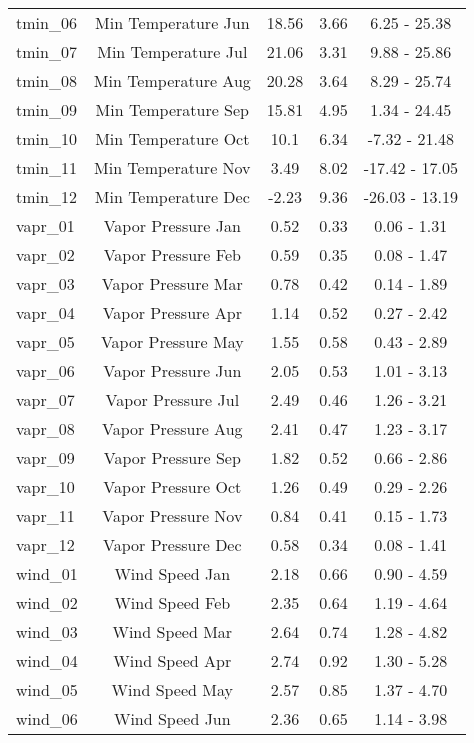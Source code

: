 \documentclass[AutoFakeBold]{LZUThesis-PgD&PhD}
\begin{document}
\begin{longtable}[H]{lcccc}
	   tmin\_06 & Min Temperature Jun & 18.56 & 3.66 & 6.25 - 25.38 \\
	   tmin\_07 & Min Temperature Jul & 21.06 & 3.31 & 9.88 - 25.86 \\
	   tmin\_08 & Min Temperature Aug & 20.28 & 3.64 & 8.29 - 25.74 \\
	   tmin\_09 & Min Temperature Sep & 15.81 & 4.95 & 1.34 - 24.45 \\
	   tmin\_10 & Min Temperature Oct & 10.1 & 6.34 & -7.32 - 21.48 \\
	   tmin\_11 & Min Temperature Nov & 3.49 & 8.02 & -17.42 - 17.05 \\
	   tmin\_12 & Min Temperature Dec & -2.23 & 9.36 & -26.03 - 13.19 \\
	   vapr\_01 & Vapor Pressure Jan & 0.52 & 0.33 & 0.06 - 1.31 \\
	   vapr\_02 & Vapor Pressure Feb & 0.59 & 0.35 & 0.08 - 1.47 \\
	   vapr\_03 & Vapor Pressure Mar & 0.78 & 0.42 & 0.14 - 1.89 \\
	   vapr\_04 & Vapor Pressure Apr & 1.14 & 0.52 & 0.27 - 2.42 \\
	   vapr\_05 & Vapor Pressure May & 1.55 & 0.58 & 0.43 - 2.89 \\
	   vapr\_06 & Vapor Pressure Jun & 2.05 & 0.53 & 1.01 - 3.13 \\
	   vapr\_07 & Vapor Pressure Jul & 2.49 & 0.46 & 1.26 - 3.21 \\
	   vapr\_08 & Vapor Pressure Aug & 2.41 & 0.47 & 1.23 - 3.17 \\
	   vapr\_09 & Vapor Pressure Sep & 1.82 & 0.52 & 0.66 - 2.86 \\
	   vapr\_10 & Vapor Pressure Oct & 1.26 & 0.49 & 0.29 - 2.26 \\
	   vapr\_11 & Vapor Pressure Nov & 0.84 & 0.41 & 0.15 - 1.73 \\
	   vapr\_12 & Vapor Pressure Dec & 0.58 & 0.34 & 0.08 - 1.41 \\
	   wind\_01 & Wind Speed Jan & 2.18 & 0.66 & 0.90 - 4.59 \\
	   wind\_02 & Wind Speed Feb & 2.35 & 0.64 & 1.19 - 4.64 \\
	   wind\_03 & Wind Speed Mar & 2.64 & 0.74 & 1.28 - 4.82 \\
	   wind\_04 & Wind Speed Apr & 2.74 & 0.92 & 1.30 - 5.28 \\
	   wind\_05 & Wind Speed May & 2.57 & 0.85 & 1.37 - 4.70 \\
	   wind\_06 & Wind Speed Jun & 2.36 & 0.65 & 1.14 - 3.98 \\

\end{longtable}
\end{document}
